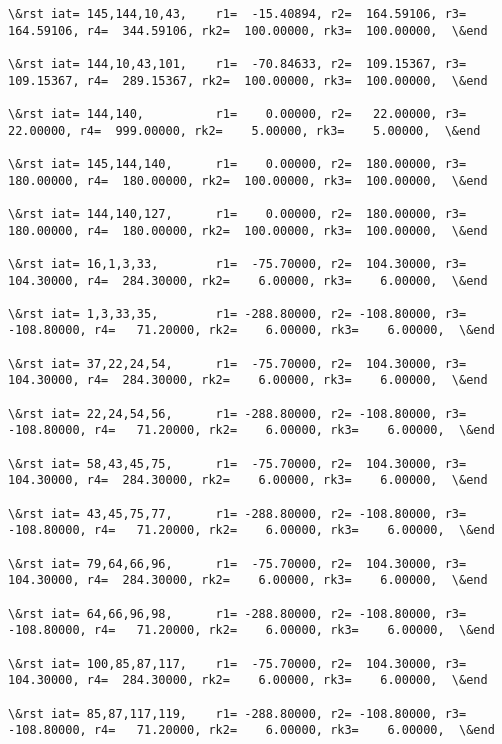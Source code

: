 \documentclass[11pt]{article}
\begin{document}
\begin{Verbatim}[commandchars=\\\{\}]
\&rst iat= 145,144,10,43,    r1=  -15.40894, r2=  164.59106, r3=  164.59106, r4=  344.59106, rk2=  100.00000, rk3=  100.00000,  \&end

\&rst iat= 144,10,43,101,    r1=  -70.84633, r2=  109.15367, r3=  109.15367, r4=  289.15367, rk2=  100.00000, rk3=  100.00000,  \&end

\&rst iat= 144,140,          r1=    0.00000, r2=   22.00000, r3=   22.00000, r4=  999.00000, rk2=    5.00000, rk3=    5.00000,  \&end

\&rst iat= 145,144,140,      r1=    0.00000, r2=  180.00000, r3=  180.00000, r4=  180.00000, rk2=  100.00000, rk3=  100.00000,  \&end

\&rst iat= 144,140,127,      r1=    0.00000, r2=  180.00000, r3=  180.00000, r4=  180.00000, rk2=  100.00000, rk3=  100.00000,  \&end

\&rst iat= 16,1,3,33,        r1=  -75.70000, r2=  104.30000, r3=  104.30000, r4=  284.30000, rk2=    6.00000, rk3=    6.00000,  \&end

\&rst iat= 1,3,33,35,        r1= -288.80000, r2= -108.80000, r3= -108.80000, r4=   71.20000, rk2=    6.00000, rk3=    6.00000,  \&end

\&rst iat= 37,22,24,54,      r1=  -75.70000, r2=  104.30000, r3=  104.30000, r4=  284.30000, rk2=    6.00000, rk3=    6.00000,  \&end

\&rst iat= 22,24,54,56,      r1= -288.80000, r2= -108.80000, r3= -108.80000, r4=   71.20000, rk2=    6.00000, rk3=    6.00000,  \&end

\&rst iat= 58,43,45,75,      r1=  -75.70000, r2=  104.30000, r3=  104.30000, r4=  284.30000, rk2=    6.00000, rk3=    6.00000,  \&end

\&rst iat= 43,45,75,77,      r1= -288.80000, r2= -108.80000, r3= -108.80000, r4=   71.20000, rk2=    6.00000, rk3=    6.00000,  \&end

\&rst iat= 79,64,66,96,      r1=  -75.70000, r2=  104.30000, r3=  104.30000, r4=  284.30000, rk2=    6.00000, rk3=    6.00000,  \&end

\&rst iat= 64,66,96,98,      r1= -288.80000, r2= -108.80000, r3= -108.80000, r4=   71.20000, rk2=    6.00000, rk3=    6.00000,  \&end

\&rst iat= 100,85,87,117,    r1=  -75.70000, r2=  104.30000, r3=  104.30000, r4=  284.30000, rk2=    6.00000, rk3=    6.00000,  \&end

\&rst iat= 85,87,117,119,    r1= -288.80000, r2= -108.80000, r3= -108.80000, r4=   71.20000, rk2=    6.00000, rk3=    6.00000,  \&end


\end{Verbatim}
\end{document}
